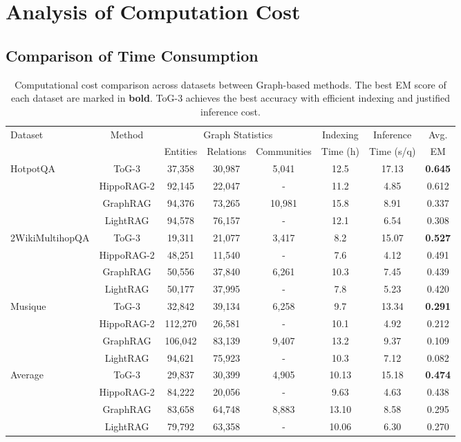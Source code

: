 \section{Analysis of Computation Cost}
\label{appendix:computation_cost}

\subsection{Comparison of Time Consumption}
\begin{table}[t]
\centering
\caption{Computational cost comparison across datasets between Graph-based methods. The best EM score of each dataset are marked in \textbf{bold}. ToG-3 achieves the best accuracy with efficient indexing and justified inference cost. }
\label{tab:computation_cost}
\scriptsize
\begin{tabular}{lccccccc}
\toprule
Dataset & Method & \multicolumn{3}{c}{Graph Statistics} & Indexing & Inference & Avg. \\
 & & Entities & Relations & Communities & Time (h) & Time (s/q) & EM \\
\midrule
\multirow{4}{*}{HotpotQA}
 & ToG-3 & 37,358 & 30,987 & 5,041 & 12.5 & 17.13 & \textbf{0.645} \\
 & HippoRAG-2 & 92,145 & 22,047 & - & 11.2 & 4.85 & 0.612 \\
 & GraphRAG & 94,376 & 73,265 & 10,981 & 15.8 & 8.91 & 0.337 \\
 & LightRAG & 94,578 & 76,157 & - & 12.1 & 6.54 & 0.308 \\
\midrule
\multirow{4}{*}{2WikiMultihopQA} 
 & ToG-3 & 19,311 & 21,077 & 3,417 & 8.2 & 15.07 & \textbf{0.527} \\
 & HippoRAG-2 & 48,251 & 11,540 & - & 7.6 & 4.12 & 0.491 \\
 & GraphRAG & 50,556 & 37,840 & 6,261 & 10.3 & 7.45 & 0.439 \\
 & LightRAG & 50,177 & 37,995 & - & 7.8 & 5.23 & 0.420 \\
\midrule
\multirow{4}{*}{Musique}
 & ToG-3 & 32,842 & 39,134 & 6,258 & 9.7 & 13.34 & \textbf{0.291} \\
 & HippoRAG-2 & 112,270 & 26,581 & - & 10.1 & 4.92 & 0.212 \\
 & GraphRAG & 106,042 & 83,139 & 9,407 & 13.2 & 9.37 & 0.109 \\
 & LightRAG & 94,621 & 75,923 & - & 10.3 & 7.12 & 0.082 \\
\midrule
\multirow{4}{*}{Average}
 & ToG-3 & 29,837 & 30,399 & 4,905 & 10.13 & 15.18 & \textbf{0.474} \\
 & HippoRAG-2 & 84,222 & 20,056 & - & 9.63 & 4.63 & 0.438 \\
 & GraphRAG & 83,658 & 64,748 & 8,883 & 13.10 & 8.58 & 0.295 \\
 & LightRAG & 79,792 & 63,358 & - & 10.06 & 6.30 & 0.270 \\
\bottomrule
\end{tabular}
\end{table}
